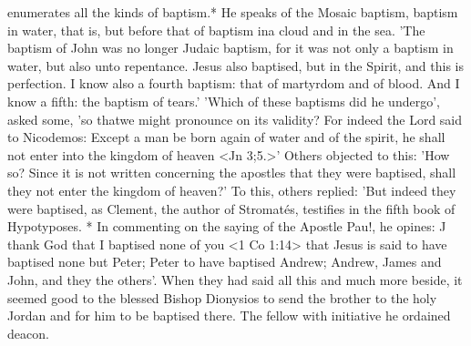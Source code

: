 enumerates all the kinds of baptism.* He speaks of the Mosaic
baptism, baptism in water, that is, but before that of baptism ina
cloud and in the sea. 'The baptism of John was no longer Judaic
baptism, for it was not only a baptism in water, but also unto
repentance. Jesus also baptised, but in the Spirit, and this is
perfection. I know also a fourth baptism: that of martyrdom and of
blood. And I know a fifth: the baptism of tears.' 'Which of these
baptisms did he undergo', asked some, 'so that\textquotesingle we might pronounce
on its validity? For indeed the Lord said to Nicodemos: Except a
man be born again of water and of the spirit, he shall not enter into
the kingdom of heaven <Jn 3;5.>' Others objected to this: 'How so?
Since it is not written concerning the apostles that they were
baptised, shall they not enter the kingdom of heaven?' To this,
others replied: 'But indeed they were baptised, as Clement, the
author of Stromatés, testifies in the fifth book of Hypotyposes. * In
commenting on the saying of the Apostle Pau!, he opines: J thank
God that I baptised none of you <1 Co 1:14> that Jesus is said to
have baptised none but Peter; Peter to have baptised Andrew;
Andrew, James and John, and they the others'. When they had said
all this and much more beside, it seemed good to the blessed Bishop
Dionysios to send the brother to the holy Jordan and for him to be
baptised there. The fellow with initiative he ordained deacon.

